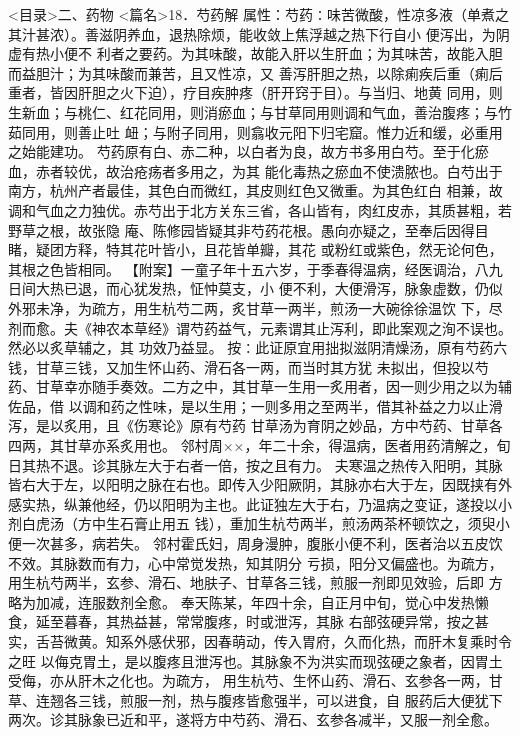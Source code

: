 \documentclass[a4paper,12pt,UTF8,twoside]{ctexbook}
\begin{document}
<目录>二、药物
<篇名>18．芍药解
属性：芍药∶味苦微酸，性凉多液（单煮之其汁甚浓）。善滋阴养血，退热除烦，能收敛上焦浮越之热下行自小 
便泻出，为阴虚有热小便不 
利者之要药。为其味酸，故能入肝以生肝血；为其味苦，故能入胆而益胆汁；为其味酸而兼苦，且又性凉，又 
善泻肝胆之热，以除痢疾后重（痢后重者，皆因肝胆之火下迫），疗目疾肿疼（肝开窍于目）。与当归、地黄 
同用，则生新血；与桃仁、红花同用，则消瘀血；与甘草同用则调和气血，善治腹疼；与竹茹同用，则善止吐 
衄；与附子同用，则翕收元阳下归宅窟。惟力近和缓，必重用之始能建功。 
芍药原有白、赤二种，以白者为良，故方书多用白芍。至于化瘀血，赤者较优，故治疮疡者多用之，为其 
能化毒热之瘀血不使溃脓也。白芍出于南方，杭州产者最佳，其色白而微红，其皮则红色又微重。为其色红白 
相兼，故调和气血之力独优。赤芍出于北方关东三省，各山皆有，肉红皮赤，其质甚粗，若野草之根，故张隐 
庵、陈修园皆疑其非芍药花根。愚向亦疑之，至奉后因得目睹，疑团方释，特其花叶皆小，且花皆单瓣，其花 
或粉红或紫色，然无论何色，其根之色皆相同。 
【附案】一童子年十五六岁，于季春得温病，经医调治，八九日间大热已退，而心犹发热，怔忡莫支，小 
便不利，大便滑泻，脉象虚数，仍似外邪未净，为疏方，用生杭芍二两，炙甘草一两半，煎汤一大碗徐徐温饮 
下，尽剂而愈。夫《神农本草经》谓芍药益气，元素谓其止泻利，即此案观之洵不误也。然必以炙草辅之，其 
功效乃益显。 
按∶此证原宜用拙拟滋阴清燥汤，原有芍药六钱，甘草三钱，又加生怀山药、滑石各一两，而当时其方犹 
未拟出，但投以芍药、甘草幸亦随手奏效。二方之中，其甘草一生用一炙用者，因一则少用之以为辅佐品，借 
以调和药之性味，是以生用；一则多用之至两半，借其补益之力以止滑泻，是以炙用，且《伤寒论》原有芍药 
甘草汤为育阴之妙品，方中芍药、甘草各四两，其甘草亦系炙用也。 
邻村周××，年二十余，得温病，医者用药清解之，旬日其热不退。诊其脉左大于右者一倍，按之且有力。 
夫寒温之热传入阳明，其脉皆右大于左，以阳明之脉在右也。即传入少阳厥阴，其脉亦右大于左，因既挟有外 
感实热，纵兼他经，仍以阳明为主也。此证独左大于右，乃温病之变证，遂投以小剂白虎汤（方中生石膏止用五 
钱），重加生杭芍两半，煎汤两茶杯顿饮之，须臾小便一次甚多，病若失。 
邻村霍氏妇，周身漫肿，腹胀小便不利，医者治以五皮饮不效。其脉数而有力，心中常觉发热，知其阴分 
亏损，阳分又偏盛也。为疏方，用生杭芍两半，玄参、滑石、地肤子、甘草各三钱，煎服一剂即见效验，后即 
方略为加减，连服数剂全愈。 
奉天陈某，年四十余，自正月中旬，觉心中发热懒食，延至暮春，其热益甚，常常腹疼，时或泄泻，其脉 
右部弦硬异常，按之甚实，舌苔微黄。知系外感伏邪，因春萌动，传入胃府，久而化热，而肝木复乘时令之旺 
以侮克胃土，是以腹疼且泄泻也。其脉象不为洪实而现弦硬之象者，因胃土受侮，亦从肝木之化也。为疏方， 
用生杭芍、生怀山药、滑石、玄参各一两，甘草、连翘各三钱，煎服一剂，热与腹疼皆愈强半，可以进食，自 
服药后大便犹下两次。诊其脉象已近和平，遂将方中芍药、滑石、玄参各减半，又服一剂全愈。 
\end{document}

